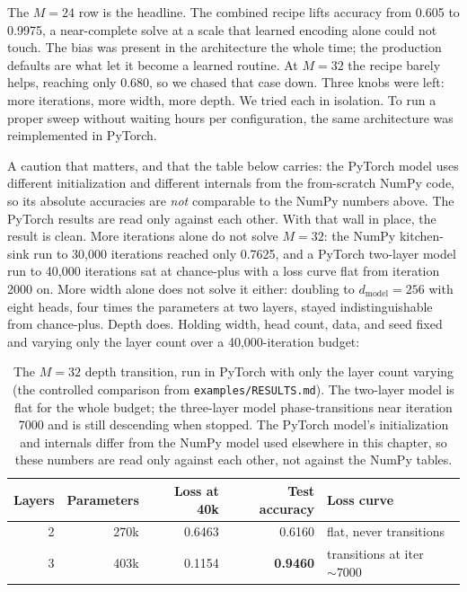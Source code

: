 The $M=24$ row is the headline. The combined recipe lifts accuracy from
0.605 to 0.9975, a near-complete solve at a scale that learned encoding alone
could not touch. The bias was present in the architecture the whole time; the
production defaults are what let it become a learned routine. At $M=32$ the
recipe barely helps, reaching only 0.680, so we chased that case down. Three
knobs were left: more iterations, more width, more depth. We tried each in
isolation. To run a proper sweep without waiting hours per configuration, the
same architecture was reimplemented in PyTorch.

A caution that matters, and that the table below carries: the PyTorch model
uses different initialization and different internals from the from-scratch
NumPy code, so its absolute accuracies are \emph{not} comparable to the NumPy
numbers above. The PyTorch results are read only against each other. With
that wall in place, the result is clean. More iterations alone do not solve
$M=32$: the NumPy kitchen-sink run to 30{,}000 iterations reached only 0.7625,
and a PyTorch two-layer model run to 40{,}000 iterations sat at chance-plus
with a loss curve flat from iteration 2000 on. More width alone does not
solve it either: doubling to $d_{\text{model}}=256$ with eight heads, four
times the parameters at two layers, stayed indistinguishable from chance-plus.
Depth does. Holding width, head count, data, and seed fixed and varying only
the layer count over a 40{,}000-iteration budget:

\begin{table}[t]
  \centering
  \begin{tabular}{@{}rrrrl@{}}
  \toprule
  Layers & Parameters & Loss at 40k & Test accuracy & Loss curve \\
  \midrule
  2 & 270k & 0.6463 & 0.6160 & flat, never transitions \\
  3 & 403k & 0.1154 & \textbf{0.9460} & transitions at iter ${\sim}7000$ \\
  \bottomrule
  \end{tabular}
  \caption{The $M=32$ depth transition, run in PyTorch with only the layer
  count varying (the controlled comparison from
  \texttt{examples/RESULTS.md}). The two-layer model is flat for the whole
  budget; the three-layer model phase-transitions near iteration 7000 and is
  still descending when stopped. The PyTorch model's initialization and
  internals differ from the NumPy model used elsewhere in this chapter, so
  these numbers are read only against each other, not against the NumPy
  tables.}
  \label{tab:depth-transition}
\end{table}

